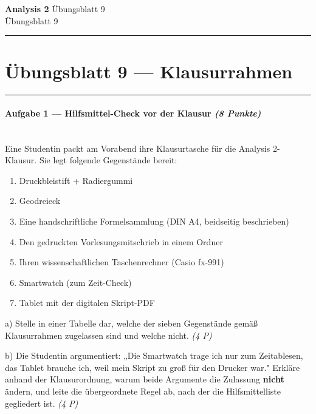 \documentclass[11pt, a4paper]{article}
\providecommand{\nichttitle}{Übungsblatt}
\providecommand{\nichtsubtitle}{}
\renewcommand{\nichttitle}{Analysis 2}
\renewcommand{\nichtsubtitle}{Übungsblatt 9}
\begin{document}
\begin{center}
{\Large\bfseries\color{accent}\nichttitle}
\ifx\nichtsubtitle\empty\else
  \\[2pt]{\normalsize\color{accent!80!black}\nichtsubtitle}
\fi
\\[2pt]
\color{accent}\rule{0.4\linewidth}{0.8pt}\color{black}
\end{center}
\vspace{4pt}


\section{Übungsblatt 9 — Klausurrahmen}


\noindent\textcolor{rulegray}{\rule{\linewidth}{0.4pt}}


\paragraph{Aufgabe 1 — Hilfsmittel-Check vor der Klausur \textit{(8 Punkte)}}\mbox{}\\[2pt]

Eine Studentin packt am Vorabend ihre Klausurtasche für die Analysis 2-Klausur. Sie legt folgende Gegenstände bereit:


\begin{enumerate}
  \item Druckbleistift + Radiergummi
  \item Geodreieck
  \item Eine handschriftliche Formelsammlung (DIN A4, beidseitig beschrieben)
  \item Den gedruckten Vorlesungsmitschrieb in einem Ordner
  \item Ihren wissenschaftlichen Taschenrechner (Casio fx-991)
  \item Smartwatch (zum Zeit-Check)
  \item Tablet mit der digitalen Skript-PDF
\end{enumerate}

a) Stelle in einer Tabelle dar, welche der sieben Gegenstände gemäß Klausurrahmen zugelassen sind und welche nicht. \textit{(4 P)}


b) Die Studentin argumentiert: „Die Smartwatch trage ich nur zum Zeitablesen, das Tablet brauche ich, weil mein Skript zu groß für den Drucker war." Erkläre anhand der Klausurordnung, warum beide Argumente die Zulassung \textbf{nicht} ändern, und leite die übergeordnete Regel ab, nach der die Hilfsmittelliste gegliedert ist. \textit{(4 P)}
\end{document}

